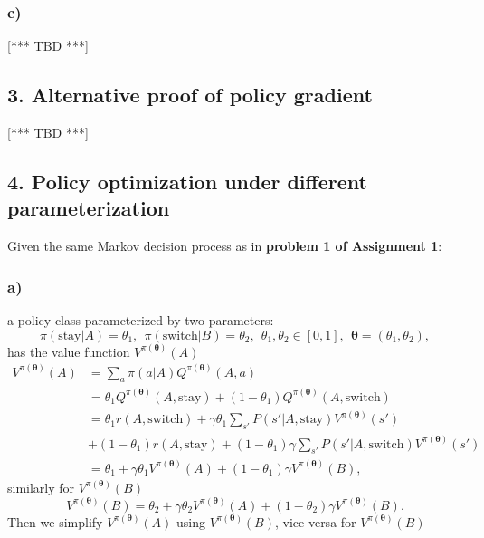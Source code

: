 \documentclass[12pt]{article}
\def\att{                    %
        \marginpar[ \hspace*{\fill} \raisebox{-0.2em}{\rule{2mm}{1.2em}} ]
        {\raisebox{-0.2em}{\rule{2mm}{1.2em}} }
        }
\def\at#1{[*** \att #1 ***]}  %
\begin{document}
\subsubsection*{c)} \at{TBD}
\subsection*{3. Alternative proof of policy gradient}
\at{TBD}
\subsection*{4. Policy optimization under different parameterization}
Given the same Markov decision process as in \textbf{problem 1 of Assignment 1}:
\subsubsection*{a)}
a policy class parameterized by two parameters:
\begin{equation*}
    \pi(\text{stay}|A) = \theta_1, ~~ \pi(\text{switch}|B) = \theta_2, ~~ \theta_1, \theta_2 \in [0,1], ~~ \mathbf{\boldsymbol\theta} = (\theta_1, \theta_2),
\end{equation*}
has the value function $V^{\pi(\boldsymbol\theta)}(A)$
\begin{equation*}
    \begin{split}
        V^{\pi(\boldsymbol\theta)}(A) &= \sum_a \pi(a|A)Q^{\pi(\boldsymbol{\theta})}(A,a)    \\
        &= \theta_1 Q^{\pi(\boldsymbol{\theta})}(A,\text{stay}) + (1-\theta_1)Q^{\pi(\boldsymbol{\theta})}(A,\text{switch})\\
        &= \theta_1r(A,\text{switch}) + \gamma\theta_1\sum_{s'}P(s'|A,\text{stay})V^{\pi(\boldsymbol\theta)}(s')\\ & + (1-\theta_1)r(A,\text{stay}) + (1-\theta_1)\gamma\sum_{s'}P(s'|A,\text{switch})V^{\pi(\boldsymbol\theta)}(s') \\
        &= \theta_1 + \gamma\theta_1V^{\pi(\boldsymbol\theta)}(A) + (1 - \theta_1)\gamma V^{\pi(\boldsymbol\theta)}(B),
    \end{split}
\end{equation*}
similarly for $V^{\pi(\boldsymbol\theta)}(B)$
\begin{equation*}
    V^{\pi(\boldsymbol\theta)}(B) = \theta_2 + \gamma\theta_2V^{\pi(\boldsymbol\theta)}(A) + (1-\theta_2)\gamma V^{\pi(\boldsymbol\theta)}(B).
\end{equation*}
Then we simplify $V^{\pi(\boldsymbol\theta)}(A)$ using $V^{\pi(\boldsymbol\theta)}(B)$, vice versa for $V^{\pi(\boldsymbol\theta)}(B)$
\end{document}
